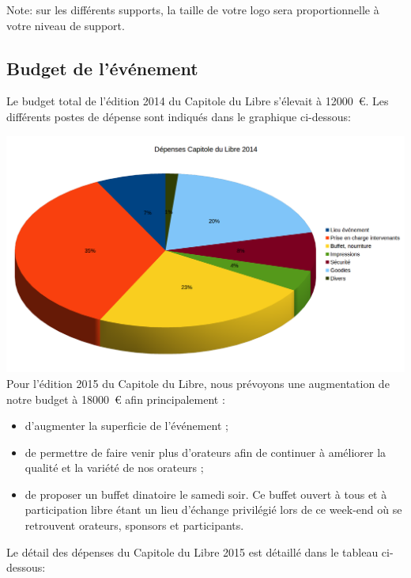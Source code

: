 Note: sur les différents supports, la taille de votre logo sera proportionnelle à votre niveau de support.

	\subsection{Budget de l’événement}

Le budget total de l'édition 2014 du Capitole du Libre s'élevait à \SI{12000}{\euro}. Les différents postes de dépense sont indiqués dans le graphique ci-dessous:

\includegraphics[scale=0.6]{Images/budget_2014.png}\\

Pour l'édition 2015 du Capitole du Libre, nous prévoyons une augmentation de notre budget à \SI{18000}{\euro} afin principalement :
\begin{itemize}[label=$\bullet$]
\item d'augmenter la superficie de l'événement ;
\item de permettre de faire venir plus d'orateurs afin de continuer à améliorer la qualité et la variété de nos orateurs ;
\item de proposer un buffet dinatoire le samedi soir. Ce buffet ouvert à tous et à participation libre étant un lieu d'échange privilégié lors de ce week-end où se retrouvent orateurs, sponsors et participants.
\end{itemize}

\Separateur

Le détail des dépenses du Capitole du Libre 2015 est détaillé dans le tableau ci-dessous:

